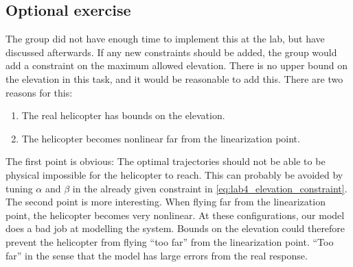 \documentclass[../main.tex]{subfiles}
\begin{document}
\subsection{Optional exercise}
The group did not have enough time to implement this at the lab, but have discussed afterwards. If any new constraints should be added, the group would add a constraint on the maximum allowed elevation. There is no upper bound on the elevation in this task, and it would be reasonable to add this. There are two reasons for this: 
\begin{enumerate}
	\item The real helicopter has bounds on the elevation.
	\item The helicopter becomes nonlinear far from the linearization point.
\end{enumerate}
The first point is obvious: The optimal trajectories should not be able to be physical impossible for the helicopter to reach. This can probably be avoided by tuning $ \alpha  $ and $ \beta $ in the already given constraint in \cref{eq:lab4_elevation_constraint}. The second point is more interesting. When flying far from the linearization point, the helicopter becomes very nonlinear. At these configurations, our model does a bad job at modelling the system. Bounds on the elevation could therefore prevent the helicopter from flying ``too far'' from the linearization point. ``Too far'' in the sense that the model has large errors from the real response.
\end{document}
